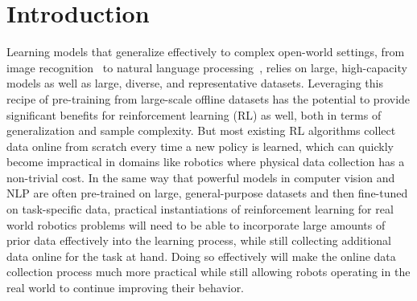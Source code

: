 \documentclass[conference]{IEEEtran}
\begin{document}
\section{Introduction}\label{sec:introduction}
Learning models that generalize effectively to complex open-world settings, from image recognition~\citep{krizhevsky2012imagenet} to natural language processing~\citep{devlin2019bert}, relies on large, high-capacity models as well as large, diverse, and representative datasets.
Leveraging this recipe of pre-training from large-scale offline datasets has the potential to provide significant benefits for reinforcement learning (RL) as well, both in terms of generalization and sample complexity.
But most existing RL algorithms collect data online from scratch every time a new policy is learned, which can quickly become impractical in domains like robotics where physical data collection has a non-trivial cost. 
In the same way that powerful models in computer vision and NLP are often pre-trained on large, general-purpose datasets and then fine-tuned on task-specific data, practical instantiations of reinforcement learning for real world robotics problems will need to be able to incorporate large amounts of prior data effectively into the learning process, while still collecting additional data online for the task at hand. 
Doing so effectively will make the online data collection process much more practical while still allowing robots operating in the real world to continue improving their behavior. 
\end{document}
